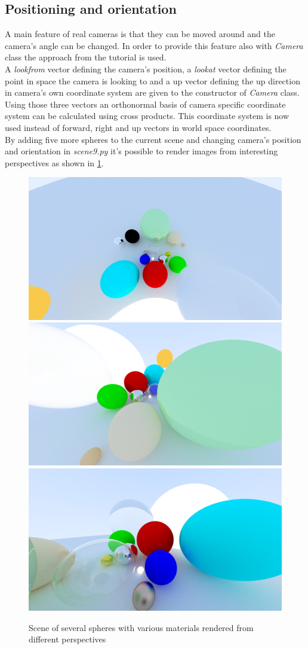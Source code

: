 \documentclass[]{article}
\begin{document}
		\subsection{Positioning and orientation}
			A main feature of real cameras is that they can be moved around and the camera's angle can be changed. In order to provide this feature also with \emph{Camera} class the approach from the tutorial is used.
			\\
			A \emph{lookfrom} vector defining the camera's position, a \emph{lookat} vector defining the point in space the camera is looking to and a up vector defining the up direction in camera's own coordinate system are given to the constructor of \emph{Camera} class. Using those three vectors an orthonormal basis of camera specific coordinate system can be calculated using cross products. This coordinate system is now used instead of forward, right and up vectors in world space coordinates.
			\\
			By adding five more spheres to the current scene and changing camera's position and orientation in \emph{scene9.py} it's possible to render images from interesting perspectives as shown in \cref{fig:image9}.
			
			\begin{figure}[h]
				\centering
				\includegraphics[width=0.30\linewidth]{image9}
				\includegraphics[width=0.30\linewidth]{image9-2}
				\includegraphics[width=0.30\linewidth]{image9-3}
				\caption{Scene of several spheres with various materials rendered from different perspectives}
				\label{fig:image9}
			\end{figure}			
			
\end{document}

